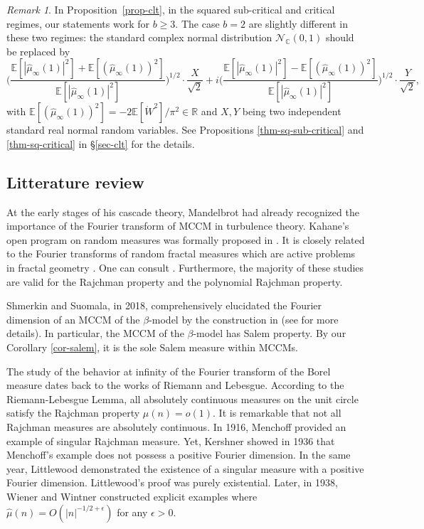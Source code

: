 \documentclass[12pt]{amsart}
\theoremstyle{definition}
\theoremstyle{remark}
\newtheorem*{remark*}{Remark}
\newcommand{\R}{\mathbb{R}}
\newcommand{\C}{\mathbb{C}}
\newcommand{\E}{\mathbb{E}}
\numberwithin{equation}{section}
\begin{document}
\begin{remark*}
In Proposition~\ref{prop-clt}, in the squared sub-critical and critical regimes,  our statements work for $b \ge 3$. The case $b = 2$ are slightly different in these two regimes: the standard complex normal distribution $\mathcal{N}_\C(0,1)$ should be replaced by 
\[
    \Big(\frac{\E[|\widehat{\mu}_\infty(1)|^2] + \E[(\widehat{\mu}_\infty(1))^2]}{\E[|\widehat{\mu}_\infty(1)|^2]}\Big)^{1/2} \cdot \frac{X}{\sqrt{2}} + i    \Big(\frac{\E[|\widehat{\mu}_\infty(1)|^2] - \E[(\widehat{\mu}_\infty(1))^2]}{\E[|\widehat{\mu}_\infty(1)|^2]}\Big)^{1/2} \cdot   \frac{Y}{\sqrt{2}},
\]
with $\E[(\widehat{\mu}_\infty(1))^2] = - 2 \E[\mathring{W}^2]/\pi^2 \in \R$    and $X, Y$ being two independent standard real normal  random variables.  See    Propositions \ref{thm-sq-sub-critical} and \ref{thm-sq-critical} in \S \ref{sec-clt} for the details. 
\end{remark*}









\subsection{Litterature review}

At the early stages of his cascade theory, Mandelbrot had already recognized the importance of the Fourier transform of MCCM in turbulence theory. Kahane’s open program on random measures was formally proposed in \cite{Ka-93}. It is closely related to the Fourier transforms of random fractal measures which are active problems in fractal geometry \cite{Mattila,BBS}. One can consult  \cite{Kahane-1987,FOS,FS}. Furthermore, the majority of these studies are valid for the Rajchman property and the polynomial Rajchman property. 


Shmerkin and Suomala, in 2018, comprehensively elucidated the Fourier dimension of an MCCM of the $\beta$-model by the construction in \cite{LP09} (see \cite[Chapter 14]{SS18} for more details). In particular, the MCCM of the $\beta$-model has Salem property. By our Corollary \ref{cor-salem}, it is the sole Salem measure within MCCMs.  




The study of the behavior at infinity of the Fourier transform of the Borel measure dates back to the works of Riemann and Lebesgue. According to the Riemann-Lebesgue Lemma,  all absolutely continuous measures on the unit circle satisfy the Rajchman property $\widehat{\mu}(n)=o(1)$.  It is remarkable that not all Rajchman measures are absolutely continuous. In 1916, Menchoff provided an example of singular Rajchman measure. Yet, Kershner \cite{K36} 
showed in 1936 that Menchoff's example does not possess a positive Fourier dimension. In the same year, Littlewood \cite{L36} demonstrated the existence of a singular measure with a positive Fourier dimension. Littlewood's proof was purely existential. Later, in 1938, Wiener and Wintner \cite{WW38} constructed explicit examples where $\widehat{\mu}(n)=O(|n|^{-1/2+\epsilon})$ for any $\epsilon>0$.
\end{document}
